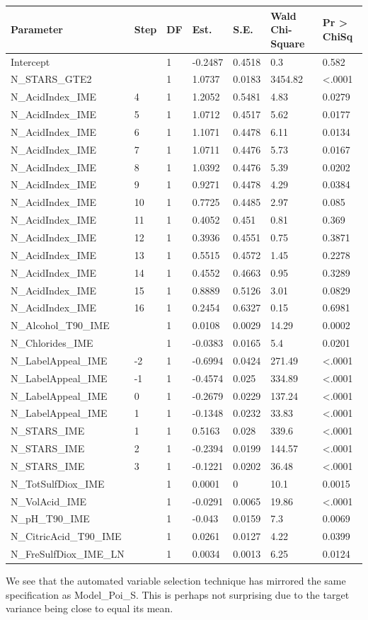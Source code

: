 \documentclass[]{article}
\begin{document}
\begin{longtable}[]{@{}lllllll@{}}
\toprule
Parameter & Step & DF & Est. & S.E. & Wald Chi-Square & Pr
\textgreater{} ChiSq\tabularnewline
\midrule
\endhead
Intercept & & 1 & -0.2487 & 0.4518 & 0.3 & 0.582\tabularnewline
N\_STARS\_GTE2 & & 1 & 1.0737 & 0.0183 & 3454.82 &
\textless{}.0001\tabularnewline
N\_AcidIndex\_IME & 4 & 1 & 1.2052 & 0.5481 & 4.83 &
0.0279\tabularnewline
N\_AcidIndex\_IME & 5 & 1 & 1.0712 & 0.4517 & 5.62 &
0.0177\tabularnewline
N\_AcidIndex\_IME & 6 & 1 & 1.1071 & 0.4478 & 6.11 &
0.0134\tabularnewline
N\_AcidIndex\_IME & 7 & 1 & 1.0711 & 0.4476 & 5.73 &
0.0167\tabularnewline
N\_AcidIndex\_IME & 8 & 1 & 1.0392 & 0.4476 & 5.39 &
0.0202\tabularnewline
N\_AcidIndex\_IME & 9 & 1 & 0.9271 & 0.4478 & 4.29 &
0.0384\tabularnewline
N\_AcidIndex\_IME & 10 & 1 & 0.7725 & 0.4485 & 2.97 &
0.085\tabularnewline
N\_AcidIndex\_IME & 11 & 1 & 0.4052 & 0.451 & 0.81 &
0.369\tabularnewline
N\_AcidIndex\_IME & 12 & 1 & 0.3936 & 0.4551 & 0.75 &
0.3871\tabularnewline
N\_AcidIndex\_IME & 13 & 1 & 0.5515 & 0.4572 & 1.45 &
0.2278\tabularnewline
N\_AcidIndex\_IME & 14 & 1 & 0.4552 & 0.4663 & 0.95 &
0.3289\tabularnewline
N\_AcidIndex\_IME & 15 & 1 & 0.8889 & 0.5126 & 3.01 &
0.0829\tabularnewline
N\_AcidIndex\_IME & 16 & 1 & 0.2454 & 0.6327 & 0.15 &
0.6981\tabularnewline
N\_Alcohol\_T90\_IME & & 1 & 0.0108 & 0.0029 & 14.29 &
0.0002\tabularnewline
N\_Chlorides\_IME & & 1 & -0.0383 & 0.0165 & 5.4 & 0.0201\tabularnewline
N\_LabelAppeal\_IME & -2 & 1 & -0.6994 & 0.0424 & 271.49 &
\textless{}.0001\tabularnewline
N\_LabelAppeal\_IME & -1 & 1 & -0.4574 & 0.025 & 334.89 &
\textless{}.0001\tabularnewline
N\_LabelAppeal\_IME & 0 & 1 & -0.2679 & 0.0229 & 137.24 &
\textless{}.0001\tabularnewline
N\_LabelAppeal\_IME & 1 & 1 & -0.1348 & 0.0232 & 33.83 &
\textless{}.0001\tabularnewline
N\_STARS\_IME & 1 & 1 & 0.5163 & 0.028 & 339.6 &
\textless{}.0001\tabularnewline
N\_STARS\_IME & 2 & 1 & -0.2394 & 0.0199 & 144.57 &
\textless{}.0001\tabularnewline
N\_STARS\_IME & 3 & 1 & -0.1221 & 0.0202 & 36.48 &
\textless{}.0001\tabularnewline
N\_TotSulfDiox\_IME & & 1 & 0.0001 & 0 & 10.1 & 0.0015\tabularnewline
N\_VolAcid\_IME & & 1 & -0.0291 & 0.0065 & 19.86 &
\textless{}.0001\tabularnewline
N\_pH\_T90\_IME & & 1 & -0.043 & 0.0159 & 7.3 & 0.0069\tabularnewline
N\_CitricAcid\_T90\_IME & & 1 & 0.0261 & 0.0127 & 4.22 &
0.0399\tabularnewline
N\_FreSulfDiox\_IME\_LN & & 1 & 0.0034 & 0.0013 & 6.25 &
0.0124\tabularnewline
\bottomrule
\end{longtable}

We see that the automated variable selection technique has mirrored the
same specification as Model\_Poi\_S. This is perhaps not surprising due
to the target variance being close to equal its mean.
\end{document}
